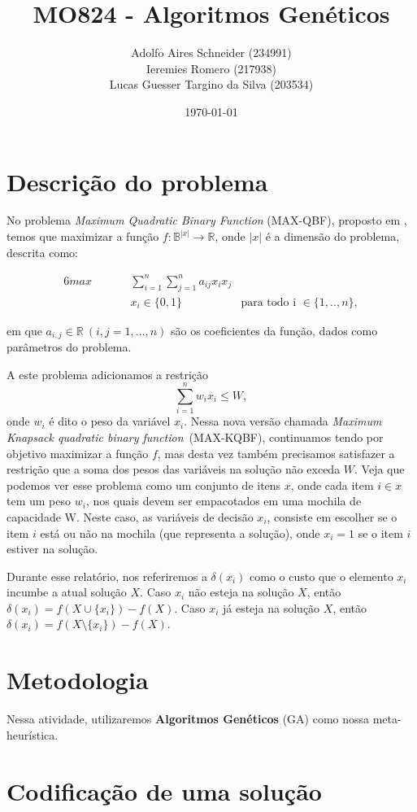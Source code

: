 \documentclass[11pt]{article}
\author{
    Adolfo Aires Schneider (234991) \\
    Ieremies Romero (217938) \\
    Lucas Guesser Targino da Silva (203534)}
\date{\today}
\title{MO824 - Algoritmos Genéticos}
\begin{document}
\maketitle
\section{Descrição do problema}
\label{sec:descricao}
No problema \emph{Maximum Quadratic Binary Function} (MAX-QBF), proposto em \cite{bib:qbf-survey},  temos que maximizar a função \(f: \mathbb{B}^{|x|} \to \mathbb{R}\), onde \(|x|\) é a dimensão do problema, descrita como:

\begin{alignat*}{6}
    max & \quad && \displaystyle{\sum_{i = 1} ^n \sum_{j = 1} ^n a_{ij} x_i x_j}&\\
    &&& x_i \in \{0, 1\}& \text{para todo i }\in \{1,..,n\},
\end{alignat*}

\noindent em que \(a_{i,j} \in \mathbb{R} \ (i,j = 1,\dots,n)\) são os coeficientes da função, dados como parâmetros do problema.

A este problema adicionamos a restrição
\[ \sum_{i=1}^{n} w_{i} x_{i} \leq W ,\]
onde \(w_{i}\) é dito o peso da variável $x_{i}$. Nessa nova versão chamada \textit{Maximum Knapsack quadratic binary function}~(MAX-KQBF), continuamos tendo por objetivo maximizar a função $f$, mas desta vez também precisamos satisfazer a restrição que a soma dos pesos das variáveis na solução não exceda \(W\). Veja que podemos ver esse problema como um conjunto de itens $x$, onde cada item $i \in x$ tem um peso $w_i$, nos quais devem ser empacotados em uma mochila de capacidade W. Neste caso, as variáveis de decisão $x_i$, consiste em escolher se o item $i$ está ou não na mochila (que representa a solução), onde $x_i = 1$ se o item $i$ estiver na solução.

Durante esse relatório, nos referiremos a $\delta (x_{i})$ como o custo que o elemento $x_{i}$ incumbe a atual solução $X$. Caso $x_{i}$ não esteja na solução $X$, então $\delta (x_i) = f(X \cup \{x_i\}) - f(X)$. Caso $x_{i}$ já esteja na solução $X$, então $\delta (x_i) = f(X \setminus \{x_i\}) - f(X)$.

\section{Metodologia}
\label{sec:metodologia}
Nessa atividade, utilizaremos \textbf{Algoritmos Genéticos} (GA) como nossa meta-heurística.
\section{Codificação de uma solução}
\label{sec:org3138bfb}
\end{document}
